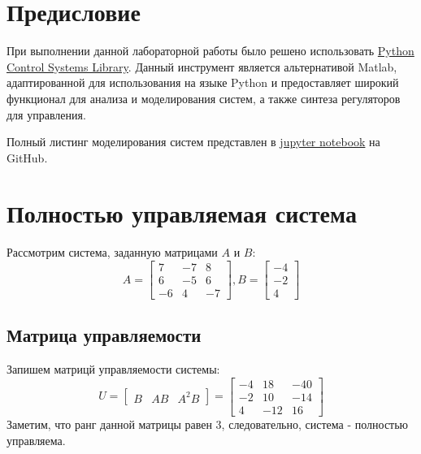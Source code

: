 \tableofcontents
\section*{Предисловие}
При выполнении данной лабораторной работы было решено использовать 
\href{https://python-control.readthedocs.io/en/0.9.4/}{Python Control Systems Library}.
Данный инструмент является альтернативой Matlab, адаптированной для использования на 
языке Python и предоставляет широкий функционал для анализа и моделирования систем,
а также синтеза регуляторов для управления.

Полный листинг моделирования систем представлен в \href{https://github.com/diuzhevVlad/control-theory-itmo-fall-2023/blob/main/Lab7/Lab7.ipynb}{jupyter notebook} на GitHub.

\pagebreak


\section{Полностью управляемая система}
Рассмотрим система, заданную матрицами $A$ и $B$:
\begin{equation*}
    A = \begin{bmatrix}
        7 & -7 & 8 \\
        6 & -5 & 6 \\
        -6 & 4 & -7
    \end{bmatrix},
    B = \begin{bmatrix}
        -4 \\ -2 \\ 4
    \end{bmatrix}
\end{equation*}

\subsection{Матрица управляемости}
Запишем матрицй управляемости системы:
\begin{equation*}
    U = \begin{bmatrix}
        B & AB & A^2B 
    \end{bmatrix}
     = 
    \begin{bmatrix}
        -4 & 18 & -40 \\
        -2 & 10 & -14 \\
        4 & -12 & 16
    \end{bmatrix}
\end{equation*}
Заметим, что ранг данной матрицы равен 3, следовательно, система - полностью управляема.

